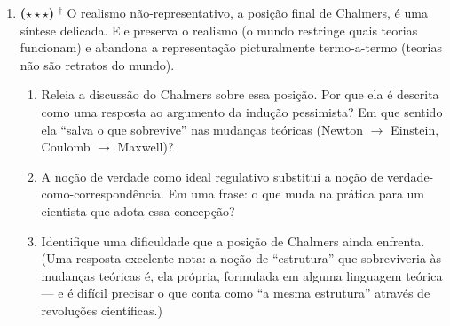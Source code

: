 \documentclass[10pt,a4paper]{extarticle}
\newcommand{\impt}[1]{\textcolor{important}{#1}}
\newcommand{\livro}{\textcolor{notice}{$^{\dagger}$}}
\newcommand{\difiii}{$\star\star\star$}
\begin{document}
\begin{enumerate}[label=\textbf{\arabic*.}, leftmargin=*, start=26]
\begin{enumerate}[label=(\alph*)]
    \item Reconstrua o argumento explicitamente, indicando qual é a sua conclusão sobre o estatuto epistêmico do sucesso empírico atual.
    \item O argumento contém um movimento autodestrutivo: ele \emph{usa} indução para argumentar contra a confiança em entidades teóricas. Isso é um problema real, ou pode ser dissolvido?
    \item Suponha que aplicássemos o argumento à inteligência artificial: ``boa parte das arquiteturas e abstrações que pareceram fundamentais na história da IA (redes simbólicas dos anos 1980, máquinas de vetores de suporte nos 2000, LSTMs) foram em grande medida abandonadas''. O que se segue daí sobre as arquiteturas atuais (\emph{transformers}, \emph{attention})? E essa analogia é boa? (Pergunta de fundo: a história da IA é análoga à história da física no que importa?)
\end{enumerate}

\item \textbf{(\difiii)} \livro{} O \impt{realismo não-representativo}, a posição final de Chalmers, é uma síntese delicada. Ele preserva o realismo (o mundo restringe quais teorias funcionam) e abandona a representação picturalmente termo-a-termo (teorias não são retratos do mundo).

\begin{enumerate}[label=(\alph*)]
    \item Releia a discussão do Chalmers sobre essa posição. Por que ela é descrita como uma resposta ao argumento da indução pessimista? Em que sentido ela ``salva o que sobrevive'' nas mudanças teóricas (Newton $\rightarrow$ Einstein, Coulomb $\rightarrow$ Maxwell)?
    \item A noção de \impt{verdade como ideal regulativo} substitui a noção de verdade-como-correspondência. Em uma frase: o que muda na prática para um cientista que adota essa concepção?
    \item Identifique uma dificuldade que a posição de Chalmers ainda enfrenta. (Uma resposta excelente nota: a noção de ``estrutura'' que sobreviveria às mudanças teóricas é, ela própria, formulada em alguma linguagem teórica --- e é difícil precisar o que conta como ``a mesma estrutura'' através de revoluções científicas.)
\end{enumerate}

\end{enumerate}
\end{document}
